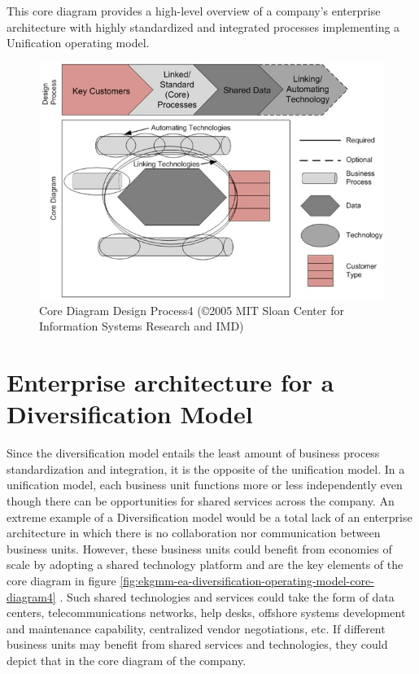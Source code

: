 This core diagram provides a high-level overview of a company's enterprise architecture with highly standardized and
integrated processes implementing a Unification operating model.

\begin{figure}[ht]
    \centering
    \includegraphics[width=\textwidth]{../images/core-diagram-design-process4.jpg}
    \caption{Core Diagram Design Process4 (©2005 MIT Sloan Center for Information Systems Research and IMD)}
    \label{fig:ekgmm-ea-core-diagram-design-process4}
\end{figure}

\section*{Enterprise architecture for a Diversification Model}

Since the diversification model entails the least amount of business process standardization and integration,
it is the opposite of the unification model.
In a unification model, each business unit functions more or less independently even though there can be opportunities
for shared services across the company.
An extreme example of a Diversification model would be a total lack of an enterprise architecture in which there is
no collaboration nor communication between business units.
However, these business units could benefit from economies of scale by adopting a shared technology platform and
are the key elements of the core diagram in figure \ref{fig:ekgmm-ea-diversification-operating-model-core-diagram4} .
Such shared technologies and services could take the form of data centers, telecommunications networks,
help desks, offshore systems development and maintenance capability, centralized vendor negotiations, etc.
If different business units may benefit from shared services and technologies, they could depict that in the
core diagram of the company.

